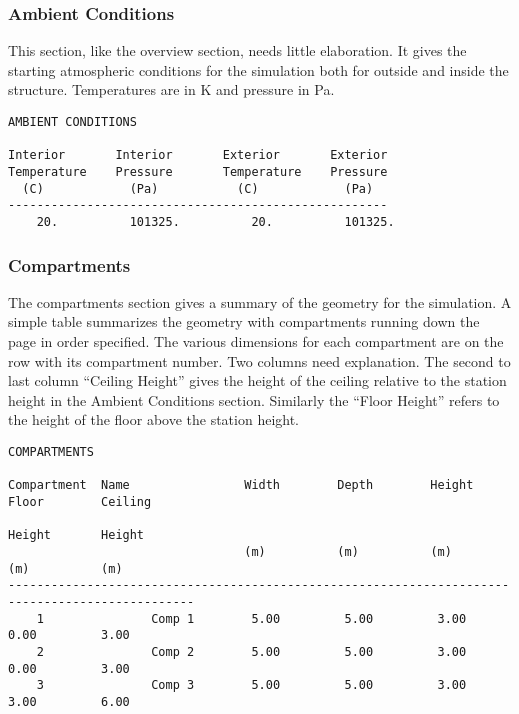 \subsubsection{Ambient Conditions}

This section, like the overview section, needs little elaboration.  It gives the starting atmospheric conditions for the simulation both for outside and inside the structure. Temperatures are in K and pressure in Pa.
\begin{lstlisting}[basicstyle=\tiny]
AMBIENT CONDITIONS

Interior       Interior       Exterior       Exterior
Temperature    Pressure       Temperature    Pressure
  (C)            (Pa)           (C)            (Pa)
-----------------------------------------------------
    20.          101325.          20.          101325.
\end{lstlisting}

\subsubsection{Compartments}
The compartments section gives a summary of the geometry for the simulation.  A simple table summarizes the geometry with compartments running down the page in order specified.  The various dimensions for each compartment are on the row with its compartment number.  Two columns need explanation.  The second to last column ``Ceiling Height'' gives the height of the ceiling relative to the station height in the Ambient Conditions section.  Similarly the ``Floor Height'' refers to the height of the floor above the station height.

\begin{lstlisting}[basicstyle=\tiny]
COMPARTMENTS

Compartment  Name                Width        Depth        Height       Floor        Ceiling
                                                                        Height       Height
                                 (m)          (m)          (m)          (m)          (m)
------------------------------------------------------------------------------------------------
    1               Comp 1        5.00         5.00         3.00         0.00         3.00
    2               Comp 2        5.00         5.00         3.00         0.00         3.00
    3               Comp 3        5.00         5.00         3.00         3.00         6.00
\end{lstlisting}


